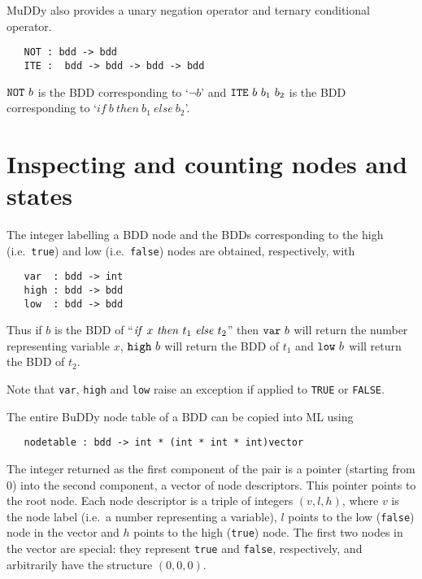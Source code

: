 \documentclass[12pt]{article}
\newcommand{\bnind}[1]{\index[MLbn]{#1}}
\renewcommand{\t}[1]{\mbox{\tt #1}}
\newcommand{\ml}[1]{{\tt #1}}
\newcommand{\Buddy}{BuDDy\xspace}
\newcommand{\Muddy}{MuDDy\xspace}
\begin{document}
\Muddy{} also provides a unary negation operator and ternary conditional operator.

\begin{verbatim}
   NOT : bdd -> bdd
   ITE :  bdd -> bdd -> bdd -> bdd
\end{verbatim}\bnind{\ml{NOT}}\bnind{\ml{ITE}}

$\t{NOT}~b$ is the BDD corresponding to  `$\neg b$' and $\t{ITE}~b~b_1~b_2$ is the BDD corresponding
to `$if~b~then~b_1~else~b_2$'.




\section{Inspecting and counting nodes and states}

The integer labelling a BDD node and the BDDs corresponding to the high
(i.e.~{\t{true}}) and low (i.e.~{\t{false}}) nodes are obtained,
respectively, with

\begin{verbatim}
   var  : bdd -> int
   high : bdd -> bdd
   low  : bdd -> bdd
\end{verbatim}\bnind{\ml{var}}\bnind{\ml{high}}\bnind{\ml{low}}

Thus if $b$ is the BDD of ``${\it{if}}~x~{\it{then}}~t_1~{\it{else}}~t_2$''
then $\t{var}~b$ will return the number representing variable $x$,
$\t{high}~b$ will return the BDD of $t_1$ and $\t{low}~b$ will return
the BDD of $t_2$.

Note that \t{var}, \t{high} and \t{low} raise an exception if applied
to \t{TRUE} or \t{FALSE}.

The entire \Buddy{} node table of a BDD can be copied into ML using

\begin{verbatim}
   nodetable : bdd -> int * (int * int * int)vector
\end{verbatim}\bnind{\ml{nodetable}}

The integer returned as the first component of the pair is a pointer
(starting from 0) into the second component, a vector of node
descriptors. This pointer points to the root node. Each node
descriptor is a triple of integers $(v,l,h)$, where $v$ is the node
label (i.e.~a number representing a variable), $l$ points to the low
({\t{false}}) node in the vector and $h$ points to the high
({\t{true}}) node. The first two nodes in the vector are special:
they represent {\t{true}} and {\t{false}}, respectively, and arbitrarily have
the structure $(0,0,0)$.
\end{document}

